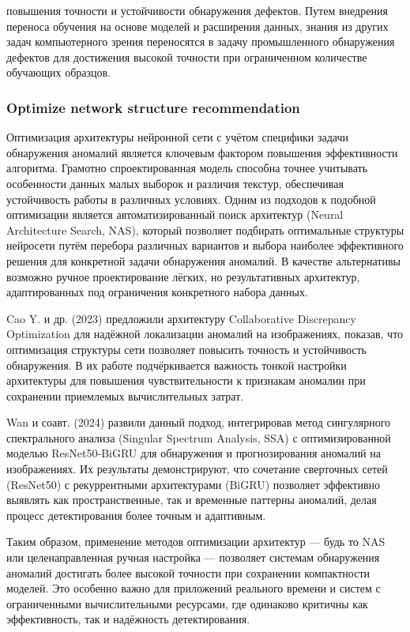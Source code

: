 \documentclass[14pt,a4paper]{article}
\begin{document}
повышения точности и устойчивости обнаружения дефектов. Путем внедрения переноса обучения на основе моделей и расширения данных, знания из других задач компьютерного зрения переносятся в задачу промышленного обнаружения дефектов для достижения высокой точности при ограниченном количестве обучающих образцов. \cite{Qifan2022}

\subsubsection{Optimize network structure recommendation}

Оптимизация архитектуры нейронной сети с учётом специфики задачи обнаружения аномалий является ключевым фактором повышения эффективности алгоритма. Грамотно спроектированная модель способна точнее учитывать особенности данных малых выборок и различия текстур, обеспечивая устойчивость работы в различных условиях. Одним из подходов к подобной оптимизации является автоматизированный поиск архитектур (Neural Architecture Search, NAS), который позволяет подбирать оптимальные структуры нейросети путём перебора различных вариантов и выбора наиболее эффективного решения для конкретной задачи обнаружения аномалий. В качестве альтернативы возможно ручное проектирование лёгких, но результативных архитектур, адаптированных под ограничения конкретного набора данных.

Cao Y. и др. (2023) предложили архитектуру Collaborative Discrepancy Optimization для надёжной локализации аномалий на изображениях, показав, что оптимизация структуры сети позволяет повысить точность и устойчивость обнаружения. В их работе подчёркивается важность тонкой настройки архитектуры для повышения чувствительности к признакам аномалии при сохранении приемлемых вычислительных затрат.

Wan и соавт. (2024) развили данный подход, интегрировав метод сингулярного спектрального анализа (Singular Spectrum Analysis, SSA) с оптимизированной моделью ResNet50-BiGRU для обнаружения и прогнозирования аномалий на изображениях. Их результаты демонстрируют, что сочетание сверточных сетей (ResNet50) с рекуррентными архитектурами (BiGRU) позволяет эффективно выявлять как пространственные, так и временные паттерны аномалий, делая процесс детектирования более точным и адаптивным.

Таким образом, применение методов оптимизации архитектур — будь то NAS или целенаправленная ручная настройка — позволяет системам обнаружения аномалий достигать более высокой точности при сохранении компактности моделей. Это особенно важно для приложений реального времени и систем с ограниченными вычислительными ресурсами, где одинаково критичны как эффективность, так и надёжность детектирования.
\end{document}
